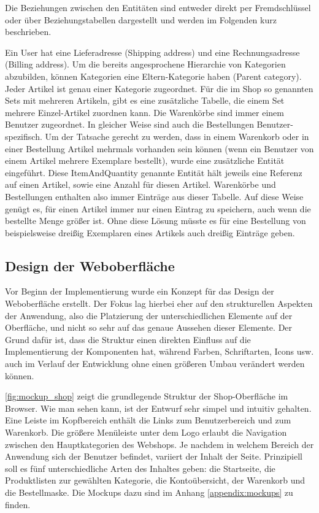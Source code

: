Die Beziehungen zwischen den Entitäten sind entweder direkt per Fremdschlüssel oder über Beziehungstabellen dargestellt und werden im Folgenden kurz beschrieben.

Ein User hat eine Lieferadresse (Shipping address) und eine Rechnungsadresse (Billing address).
Um die bereits angesprochene Hierarchie von Kategorien abzubilden, können Kategorien eine Eltern-Kategorie haben (Parent category).
Jeder Artikel ist genau einer Kategorie zugeordnet. Für die im Shop so genannten Sets mit mehreren Artikeln, gibt es eine zusätzliche Tabelle, die einem Set mehrere Einzel-Artikel zuordnen kann.
Die Warenkörbe sind immer einem Benutzer zugeordnet. In gleicher Weise sind auch die Bestellungen Benutzer-spezifisch.
Um der Tatsache gerecht zu werden, dass in einem Warenkorb oder in einer Bestellung Artikel mehrmals vorhanden sein können (wenn ein Benutzer von einem Artikel mehrere Exemplare bestellt), wurde eine zusätzliche Entität eingeführt.
Diese ItemAndQuantity genannte Entität hält jeweils eine Referenz auf einen Artikel, sowie eine Anzahl für diesen Artikel.
Warenkörbe und Bestellungen enthalten also immer Einträge aus dieser Tabelle.
Auf diese Weise genügt es, für einen Artikel immer nur einen Eintrag zu speichern, auch wenn die bestellte Menge größer ist.
Ohne diese Lösung müsste es für eine Bestellung von beispielsweise dreißig Exemplaren eines Artikels auch dreißig Einträge geben.

\subsection{Design der Weboberfläche}
Vor Beginn der Implementierung wurde ein Konzept für das Design der Weboberfläche erstellt.
Der Fokus lag hierbei eher auf den strukturellen Aspekten der Anwendung, also die Platzierung der unterschiedlichen Elemente auf der Oberfläche, und nicht so sehr auf das genaue Aussehen dieser Elemente.
Der Grund dafür ist, dass die Struktur einen direkten Einfluss auf die Implementierung der Komponenten hat, während Farben, Schriftarten, Icons usw. auch im Verlauf der Entwicklung ohne einen größeren Umbau verändert werden können.

\cref{fig:mockup_shop} zeigt die grundlegende Struktur der Shop-Oberfläche im Browser.
Wie man sehen kann, ist der Entwurf sehr simpel und intuitiv gehalten. Eine Leiste im Kopfbereich enthält die Links zum Benutzerbereich und zum Warenkorb.
Die größere Menüleiste unter dem Logo erlaubt die Navigation zwischen den Hauptkategorien des Webshops.
Je nachdem in welchem Bereich der Anwendung sich der Benutzer befindet, variiert der Inhalt der Seite.
Prinzipiell soll es fünf unterschiedliche Arten des Inhaltes geben: die Startseite, die Produktlisten zur gewählten Kategorie, die Kontoübersicht, der Warenkorb und die Bestellmaske.
Die Mockups dazu sind im Anhang \ref{appendix:mockups} zu finden.

